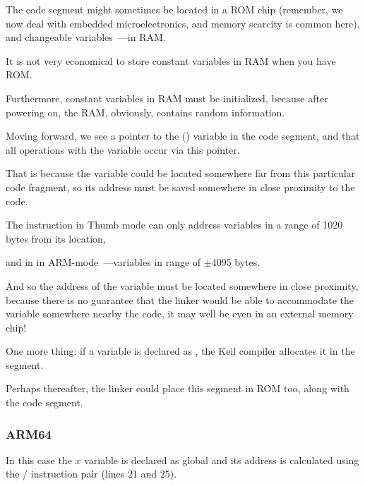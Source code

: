The code segment might sometimes be located in a \ac{ROM} chip (remember, we now deal
with embedded microelectronics, and memory scarcity is common here), and changeable 
variables~---in \ac{RAM}.

It is not very economical to store constant variables in RAM when you have ROM.

Furthermore, constant variables in RAM must be initialized, because after powering on, the RAM, obviously, contains random information.


Moving forward, we see a pointer to the  () variable in the code segment, and that all
operations with the variable occur via this pointer.

That is because the  variable could be located somewhere far from this particular code fragment, so its address
must be saved somewhere in close proximity to the code.

The  instruction in Thumb mode can only address variables in a range of 1020 bytes from its location, 

and in in ARM-mode~---variables in range of $\pm{}4095$ bytes.

And so the address of the  variable
must be located somewhere in close proximity, because there is no guarantee that the linker would be able to accommodate the variable somewhere nearby the code, it may well be even in an external memory chip!

\myindex{\ROM}

One more thing: if a variable is declared as , the Keil compiler allocates it in 
the  segment.

Perhaps thereafter, the linker could place this segment in ROM too, along with the code segment.

\subsubsection{ARM64}




In this case the $x$ variable is declared as global and its address is calculated using 
the / instruction pair (lines 21 and 25).

